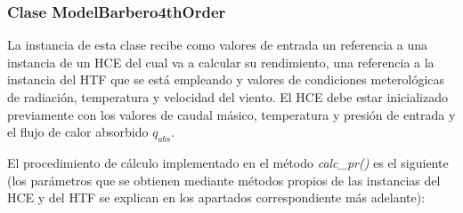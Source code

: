 \subsubsection{Clase ModelBarbero4thOrder}

La instancia de esta clase recibe como valores de entrada un referencia a una instancia de un HCE del cual va a calcular su rendimiento, una referencia a la instancia del HTF que se está empleando y valores de condiciones meterológicas de radiación, temperatura y velocidad del viento. El HCE debe estar inicializado previamente con los valores de caudal másico, temperatura y presión de entrada y el flujo de calor absorbido \(q_{abs}\).

El procedimiento de cálculo implementado en el método \emph{calc\_pr()} es el siguiente (los parámetros que se obtienen mediante métodos propios de las instancias del HCE y del HTF se explican en los apartados correspondiente más adelante): 
